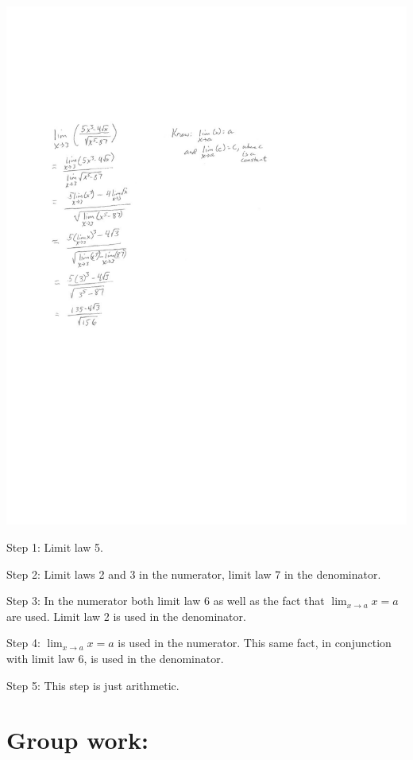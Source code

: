 \documentclass[handout,nooutcomes]{ximera}
\begin{document}
	\begin{image}
	\includegraphics[trim= 150 440 300 185]{Figure2.pdf}
	\end{image}
\newpage
	\begin{freeResponse}
	Step 1:  Limit law 5.
		
	Step 2:  Limit laws 2 and 3 in the numerator, limit law 7 in the denominator.
		
	Step 3:  In the numerator both limit law 6 as well as the fact that $\lim_{x \to a}x = a$ are used.  Limit law 2 is used in the denominator.
		
	Step 4:  $\lim_{x \to a}x = a$ is used in the numerator.  This same fact, in conjunction with limit law 6, is used in the denominator.
		
	Step 5:  This step is just arithmetic.
	\end{freeResponse}
	
	

\section*{Group work:}
\end{document}
